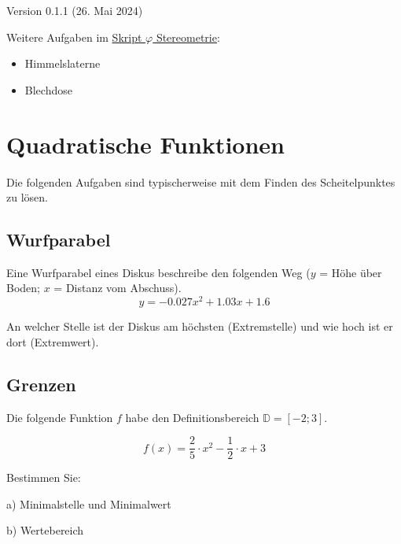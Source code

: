 


\renewcommand{\metaHeaderLine}{Extremwertaufgaben}
\renewcommand{\arbeitsblattTitel}{Extremwertaufgaben}


\arbeitsblattHeader{}

\begin{center}Version 0.1.1 (26. Mai 2024) \end{center}

Weitere Aufgaben im \href{https://olat.bms-w.ch/auth/RepositoryEntry/6029786/CourseNode/109695301829998}{Skript $\varphi$ Stereometrie}:

\begin{itemize}
\item Himmelslaterne
\item Blechdose
\end{itemize}

\newpage

\section{Quadratische Funktionen}
Die folgenden Aufgaben sind typischerweise mit dem Finden des
Scheitelpunktes zu lösen.

\subsection{Wurfparabel}
Eine Wurfparabel eines Diskus beschreibe den folgenden Weg ($y$ = Höhe über Boden;
$x$ = Distanz vom Abschuss).
$$y =-0.027 x^2 + 1.03x + 1.6$$

An welcher Stelle ist der Diskus am höchsten (Extremstelle) und wie
hoch ist er dort (Extremwert).

\subsection{Grenzen}
Die folgende Funktion $f$ habe den Definitionsbereich
$\mathbb{D}=[-2;3]$.

$$f(x) = \frac25\cdot{}x^2 - \frac12\cdot{}x + 3$$

Bestimmen Sie:

a) Minimalstelle und Minimalwert

b) Wertebereich

